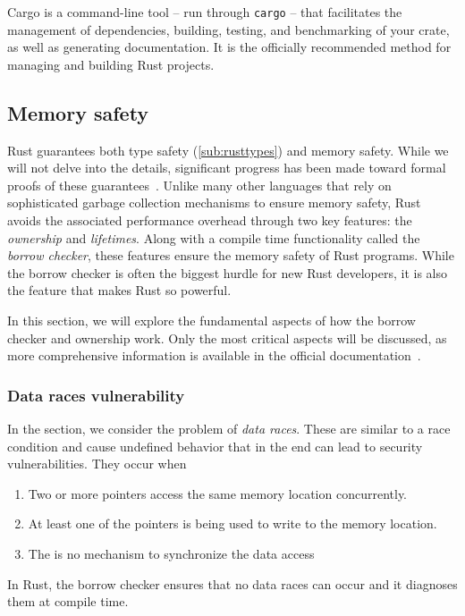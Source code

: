 \documentclass[11pt]{report}
\theoremstyle{definition}
\theoremstyle{plain}
\begin{document}
Cargo is a command-line tool -- run through \texttt{cargo} -- that facilitates the management of dependencies, building, testing, and benchmarking of your crate, as well as generating documentation. It is the officially recommended method for managing and building Rust projects.


\subsection{Memory safety}\label{sec:rustborrow} %
Rust guarantees both type safety (\autoref{sub:rusttypes}) and memory safety. While we will not delve into the details, significant progress has been made toward formal proofs of these guarantees~\cite{jung2017rustbelt}. Unlike many other languages that rely on sophisticated garbage collection mechanisms to ensure memory safety, Rust avoids the associated performance overhead through two key features: the \textit{ownership} and \textit{lifetimes}. Along with a compile time functionality called the \textit{borrow checker}, these features ensure the memory safety of Rust programs. While the borrow checker is often the biggest hurdle for new Rust developers, it is also the feature that makes Rust so powerful.

In this section, we will explore the fundamental aspects of how the borrow checker and ownership work. Only the most critical aspects will be discussed, as more comprehensive information is available in the official documentation~\cite{rustlangRustProgramming}.

\subsubsection{Data races vulnerability}
In the section, we consider the problem of \textit{data races}. These are similar to a race condition and cause undefined behavior that in the end can lead to security vulnerabilities. They occur when
\begin{enumerate}[parsep=0pt, itemsep=0pt]
  \item Two or more pointers access the same memory location concurrently.
  \item At least one of the pointers is being used to write to the memory location.
  \item The is no mechanism to synchronize the data access
\end{enumerate}
In Rust, the borrow checker ensures that no data races can occur and it diagnoses them at compile time.
\end{document}
